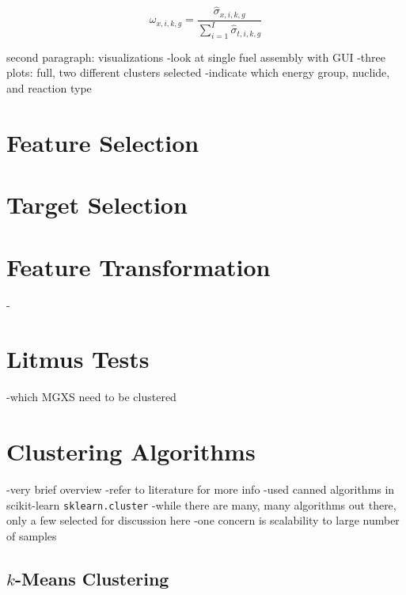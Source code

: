 \begin{equation}
\label{eqn:chap10-tot-frac}
\omega_{x,i,k,g} = \frac{\hat{\sigma}_{x,i,k,g}}{\displaystyle\sum\limits_{i=1}^{I}\hat{\sigma}_{t,i,k,g}}
\end{equation}

second paragraph: visualizations
-look at single fuel assembly with GUI
-three plots: full, two different clusters selected
-indicate which energy group, nuclide, and reaction type


\section{Feature Selection}
\label{sec:chap10-litmus}

\section{Target Selection}
\label{sec:chap10-feature-select}

\section{Feature Transformation}
\label{sec:chap10-feature-transform}

-

\section{Litmus Tests}
\label{sec:chap10-litmus}

-which \ac{MGXS} need to be clustered


\section{Clustering Algorithms}
\label{subsec:chap10-clustering}

-very brief overview
-refer to literature for more info
-used canned algorithms in scikit-learn \texttt{sklearn.cluster}
-while there are many, many algorithms out there, only a few selected for discussion here
  -one concern is scalability to large number of samples

\subsection{$k$-Means Clustering}
\label{subsec:chap10-kmeans}

